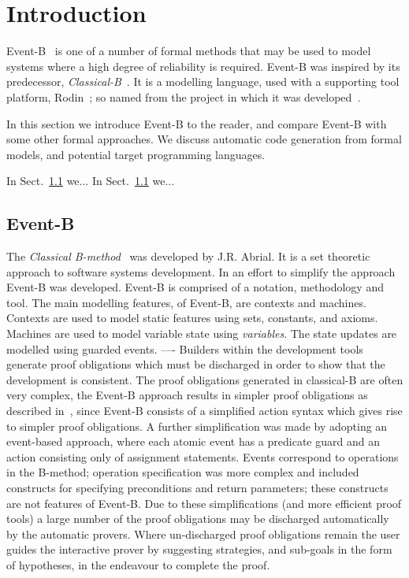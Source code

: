 \section{Introduction}
Event-B~\cite{ABR10} is one of a number of formal methods that may be used to model systems where a high degree of reliability is required. Event-B was inspired by its predecessor, \emph{Classical-B}~\cite{TheBBook}. It is a modelling language, used with a supporting tool platform, Rodin~\cite{abrial10rodin}; so named from the project in which it was developed~\cite{RodinTool}.  

In this section we introduce Event-B to the reader, and compare Event-B with some other formal approaches. We discuss automatic code generation from formal models, and potential target programming languages.

In Sect.~\ref{} we...
In Sect.~\ref{} we...

\subsection{Event-B}
The \emph{Classical B-method}~\cite{TheBBook,CNP,CNPInterface,B4Free} was developed by J.R. Abrial. It is a set theoretic approach to software systems development. In an effort to simplify the approach~\cite{Hallerstede07} Event-B was developed. Event-B is comprised of a notation, methodology and tool. The main modelling features, of Event-B, are contexts and machines. Contexts are used to model static features using sets, constants, and axioms. Machines are used to model variable state using \emph{variables}. The state updates are modelled using guarded events. 
----
Builders within the development tools generate proof obligations which must be discharged in order to show that the development is consistent. The proof obligations generated in classical-B are often very complex, the Event-B approach results in simpler proof obligations as described in~\cite{Hallerstede07}, since Event-B consists of a simplified action syntax which gives rise to simpler proof obligations. A further simplification was made by adopting an event-based approach, where each atomic event has a predicate guard and an action consisting only of assignment statements. Events correspond to operations in the B-method; operation specification was more complex and included constructs for specifying preconditions and return parameters; these constructs are not features of Event-B. Due to these simplifications (and more efficient proof tools) a large number of the proof obligations may be discharged automatically by the automatic provers. Where un-discharged proof obligations remain the user guides the interactive prover by suggesting strategies, and sub-goals in the form of hypotheses, in the endeavour to complete the proof. 

